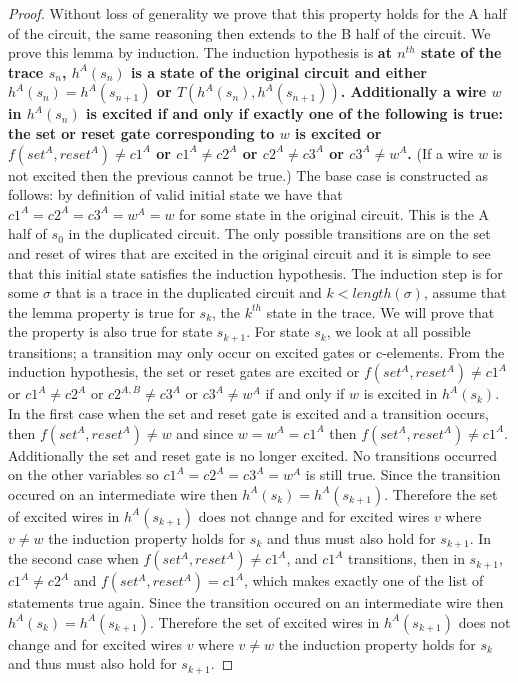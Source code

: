 \documentclass{article}
\begin{document}
\begin{proof}
Without loss of generality we prove that this property holds for the A half of the circuit, the same reasoning then extends to the B half of the circuit.  We prove this lemma by induction.  The induction hypothesis is \textbf{at $n^{th}$ state of the trace $s_n$, $h^A(s_n)$ is a state of the original circuit and either $h^A(s_n)=h^A(s_{n+1})$ or $T(h^A(s_n), h^A(s_{n+1}))$.  Additionally a wire $w$ in $h^A(s_n)$ is excited if and only if exactly one of the following is true: the set or reset gate corresponding to $w$ is excited or $f(set^A, reset^A) \neq c1^A$ or $c1^{A}\neq c2^{A}$ or $c2^{A}\neq c3^{A}$ or $c3^{A} \neq w^A$. } (If a wire $w$ is not excited then the previous cannot be true.)  
\newline
The base case is constructed as follows:  by definition of valid initial state we have that $c1^A=c2^A=c3^A=w^A=w$ for some state in the original circuit.  This is the A half of $s_0$ in the duplicated circuit.  The only possible transitions are on the set and reset of wires that are excited in the original circuit and it is simple to see that this initial state satisfies the induction hypothesis.   \newline
The induction step is for some $\sigma$ that is a trace in the duplicated circuit and $k < length(\sigma)$, assume that the lemma property is true for $s_k$, the $k^{th}$ state in the trace.  We will prove that the property is also true for state $s_{k+1}$.  \newline
For state $s_k$, we look at all possible transitions; a transition may only occur on excited gates or c-elements.  From the induction hypothesis, the set or reset gates are excited or $f(set^A, reset^A) \neq c1^A$ or $c1^{A}\neq c2^{A}$ or $c2^{A,B}\neq c3^{A}$ or $c3^{A} \neq w^A$ if and only if $w$ is excited in $h^A(s_k)$.  In the first case when the set and reset gate is excited and a transition occurs, then $f(set^A, reset^A)\neq w$ and since $w=w^A=c1^A$ then $f(set^A, reset^A)\neq c1^A$.  Additionally the set and reset gate is no longer excited.  No transitions occurred on the other variables so $c1^A=c2^A=c3^A=w^A$ is still true.  Since the transition occured on an intermediate wire then $h^A(s_k)=h^A(s_{k+1})$.  Therefore the set of excited wires in $h^A(s_{k+1})$ does not change and for excited wires $v$ where $v\neq w$ the induction property holds for $s_k$ and thus must also hold for $s_{k+1}$. \newline
In the second case when $f(set^A, reset^A)\neq c1^A$, and $c1^A$ transitions, then in $s_{k+1}$, $c1^A\neq c2^A$ and $f(set^A, reset^A)= c1^A$, which makes exactly one of the list of statements true again.  Since the transition occured on an intermediate wire then $h^A(s_k)=h^A(s_{k+1})$.  Therefore the set of excited wires in $h^A(s_{k+1})$ does not change and for excited wires $v$ where $v\neq w$ the induction property holds for $s_k$ and thus must also hold for $s_{k+1}$. %

\end{proof}
\end{document}
